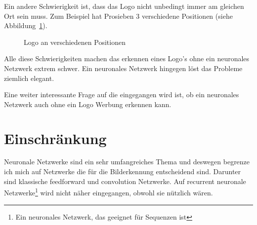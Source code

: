 \documentclass[12pt,a4paper]{report}
\begin{document}
Ein andere Schwierigkeit ist, dass das Logo nicht unbedingt immer am gleichen Ort sein muss.
Zum Beispiel hat Prosieben 3 verschiedene Positionen (siehe Abbildung~\ref{fig:logo3}).
\begin{figure}[h]%
    \centering
    \qquad
    \qquad
    \caption{Logo an verschiedenen Positionen}%
    \label{fig:logo3}%
\end{figure}
Alle diese Schwierigkeiten machen das erkennen eines Logo's ohne ein neuronales Netzwerk extrem schwer.
Ein neuronales Netzwerk hingegen löst das Probleme ziemlich elegant.

Eine weiter interessante Frage auf die eingegangen wird ist, ob ein neuronales Netzwerk auch ohne ein Logo Werbung erkennen kann.

\section{Einschränkung}
Neuronale Netzwerke sind ein sehr umfangreiches Thema und deswegen begrenze ich mich auf Netzwerke die für die Bilderkennung entscheidend sind.
Darunter sind klassische feedforward und convolution Netzwerke.
Auf recurrent neuronale Netzwerke\footnote{Ein neuronales Netzwerk, das geeignet für Sequenzen ist} wird nicht näher eingegangen,
obwohl sie nützlich wären.
\end{document}
